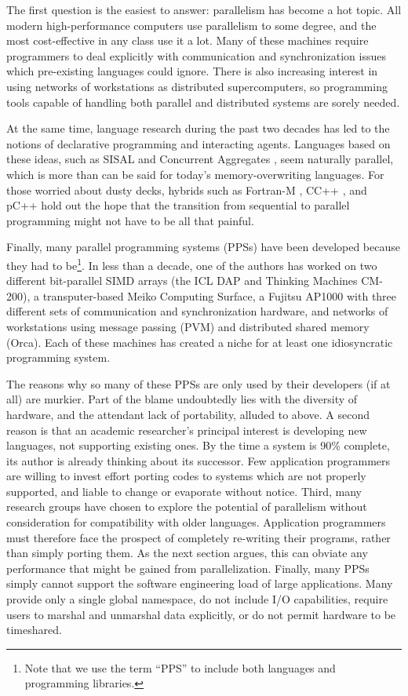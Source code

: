 The first question is the easiest to answer: parallelism has become a hot topic.
All modern high-performance computers use parallelism to some degree,
and the most cost-effective in any class use it a lot.
Many of these machines require programmers to deal explicitly with
communication and synchronization issues which pre-existing languages could ignore.
There is also increasing interest in using networks of workstations as distributed supercomputers,
so programming tools capable of handling both parallel and distributed systems are sorely needed.

At the same time,
language research during the past two decades has led to
the notions of declarative programming and interacting agents.
Languages based on these ideas,
such as SISAL \cite{b:sisal-overview} and Concurrent Aggregates \cite{b:concurrent-aggregates},
seem naturally parallel,
which is more than can be said for today's memory-overwriting languages.
For those worried about dusty decks,
hybrids such as Fortran-M \cite{b:fortran-m},
CC++ \cite{b:verified-ccpp},
and pC++ \cite{b:pc-plusplus-distrib}
hold out the hope that the transition from sequential to parallel programming
might not have to be all that painful.

Finally,
many parallel programming systems (PPSs) have been developed because
they had to be\footnote{Note that
	we use the term ``PPS'' to include both languages and programming libraries.}.
In less than a decade,
one of the authors has worked on
two different bit-parallel SIMD arrays (the ICL DAP and Thinking Machines CM-200),
a transputer-based Meiko Computing Surface,
a Fujitsu AP1000 with three different sets of communication and synchronization hardware,
and networks of workstations using message passing (PVM) and distributed shared memory (Orca).
Each of these machines has created a niche for at least one idiosyncratic programming system.

The reasons why so many of these PPSs are only used by their developers (if at all) are murkier.
Part of the blame undoubtedly lies with the diversity of hardware,
and the attendant lack of portability,
alluded to above.
A second reason is that an academic researcher's principal interest is developing new languages,
not supporting existing ones.
By the time a system is 90\% complete,
its author is already thinking about its successor.
Few application programmers are willing to invest effort porting codes
to systems which are not properly supported,
and liable to change or evaporate without notice.
Third,
many research groups have chosen to explore the potential of parallelism
without consideration for compatibility with older languages.
Application programmers must therefore face the prospect of completely re-writing their programs,
rather than simply porting them.
As the next section argues,
this can obviate any performance that might be gained from parallelization.
Finally,
many PPSs simply cannot support the software engineering load of large applications.
Many provide only a single global namespace,
do not include I/O capabilities,
require users to marshal and unmarshal data explicitly,
or do not permit hardware to be timeshared.

